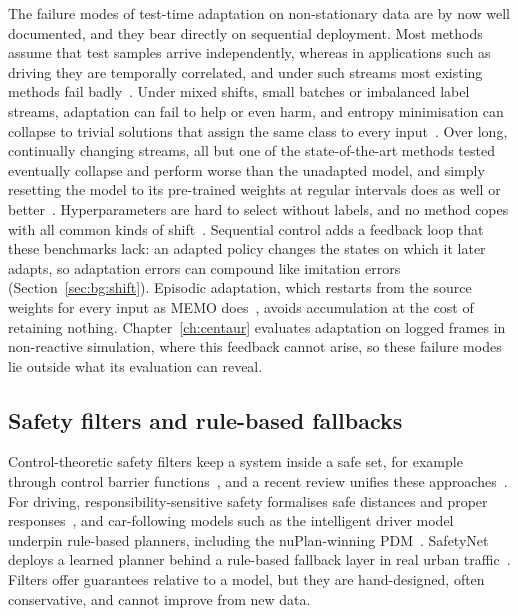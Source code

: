 The failure modes of test-time adaptation on non-stationary data are by now well documented, and they bear directly on sequential deployment. Most methods assume that test samples arrive independently, whereas in applications such as driving they are temporally correlated, and under such streams most existing methods fail badly~\cite{gong2022note}. Under mixed shifts, small batches or imbalanced label streams, adaptation can fail to help or even harm, and entropy minimisation can collapse to trivial solutions that assign the same class to every input~\cite{niu2023sar}. Over long, continually changing streams, all but one of the state-of-the-art methods tested eventually collapse and perform worse than the unadapted model, and simply resetting the model to its pre-trained weights at regular intervals does as well or better~\cite{press2023rdumb}. Hyperparameters are hard to select without labels, and no method copes with all common kinds of shift~\cite{zhao2023pitfalls}. Sequential control adds a feedback loop that these benchmarks lack: an adapted policy changes the states on which it later adapts, so adaptation errors can compound like imitation errors (Section~\ref{sec:bg:shift}). Episodic adaptation, which restarts from the source weights for every input as MEMO does~\cite{zhang2022memo}, avoids accumulation at the cost of retaining nothing. Chapter~\ref{ch:centaur} evaluates adaptation on logged frames in non-reactive simulation, where this feedback cannot arise, so these failure modes lie outside what its evaluation can reveal.

\subsection{Safety filters and rule-based fallbacks}

Control-theoretic safety filters keep a system inside a safe set, for example through control barrier functions~\cite{ames2019cbf}, and a recent review unifies these approaches~\cite{hsu2024safetyfilter}. For driving, responsibility-sensitive safety formalises safe distances and proper responses~\cite{shalevshwartz2017rss}, and car-following models such as the intelligent driver model~\cite{treiber2000idm} underpin rule-based planners, including the nuPlan-winning PDM~\cite{dauner2023parting}. SafetyNet deploys a learned planner behind a rule-based fallback layer in real urban traffic~\cite{vitelli2022safetynet}. Filters offer guarantees relative to a model, but they are hand-designed, often conservative, and cannot improve from new data.

